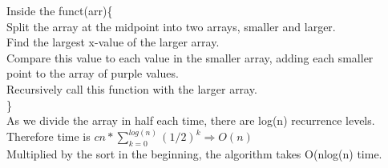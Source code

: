 \documentclass[12pt]{article}
\begin{document}
\noindent Inside the funct(arr)\{\\
\indent Split the array at the midpoint into two arrays, smaller and larger.\\

Find the largest x-value of the larger array.\\
\indent Compare this value to each value in the smaller array, adding each smaller\\
\indent point to the array of purple values.\\

Recursively call this function with the larger array.\\
\}\\

As we divide the array in half each time, there are log(n) recurrence levels.\\
Therefore time is  $cn*\sum_{k=0}^{log(n)}(1/2)^k \Rightarrow O(n)$\\
Multiplied by the sort in the beginning, the algorithm takes O(nlog(n) time.







\end{document}
